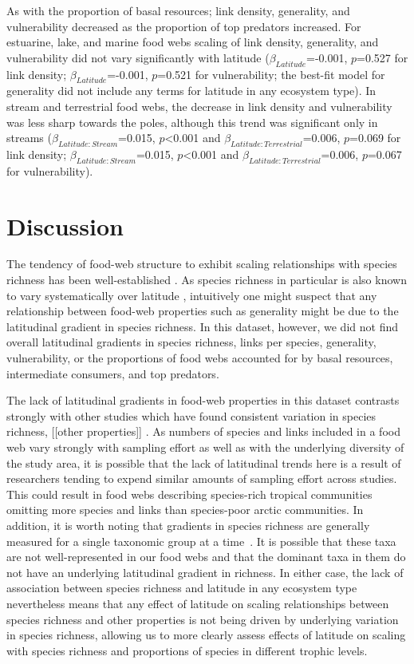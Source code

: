 \documentclass[12pt]{article}
\begin{document}
As with the proportion of basal resources; link density, generality, and
vulnerability decreased as the proportion of top predators increased. For
estuarine, lake, and marine food webs scaling of link density, generality, and
vulnerability did not vary significantly with latitude
($\beta_{Latitude}$=-0.001, $p$=0.527 for link density;
$\beta_{Latitude}$=-0.001, $p$=0.521 for vulnerability; the best-fit model for
generality did not include any terms for latitude in any ecosystem type). In
stream and terrestrial food webs, the decrease in link density and
vulnerability was less sharp towards the poles, although this trend was
significant only in streams ($\beta_{Latitude:Stream}$=0.015,
$p$\textless0.001 and $\beta_{Latitude:Terrestrial}$=0.006, $p$=0.069 for link
density; $\beta_{Latitude:Stream}$=0.015, $p$\textless0.001 and
$\beta_{Latitude:Terrestrial}$=0.006, $p$=0.067 for vulnerability).



\section*{Discussion}

The tendency of food-web structure to exhibit scaling relationships with
species richness has been well-established \citep{Dunne2004,Riede2010}. As
species richness in particular is also known to vary systematically over
latitude \citep{}, intuitively one might suspect that any relationship
between food-web properties such as generality might be due to the latitudinal
gradient in species richness. In this dataset, however, we did not find
overall latitudinal gradients in species richness, links per species, 
generality, vulnerability, or the proportions of food webs accounted for by 
basal resources, intermediate consumers, and top predators. 


The lack of latitudinal gradients in food-web properties in this dataset contrasts
strongly with other studies which have found consistent variation in species richness,
[[other properties]] \citep{}. As numbers of species and links included in a food web
vary strongly with sampling effort as well as with the underlying diversity of the study
area, it is possible that the lack of latitudinal trends here is a result of researchers
tending to expend similar amounts of sampling effort across studies. This could result in
food webs describing species-rich tropical communities omitting more species and links
than species-poor arctic communities. In addition, it is worth noting that gradients in
species richness are generally measured for a single taxonomic group at a time~\citep{}.
It is possible that these taxa are not well-represented in our food webs and that the
dominant taxa in them do not have an underlying latitudinal gradient in richness. In
either case, the lack of association between species richness
and latitude in any ecosystem type nevertheless means that any effect of latitude on scaling relationships
between species richness and other properties is not being driven by underlying variation in
species richness, allowing us to more clearly assess effects of latitude on scaling with 
species richness and proportions of species in different trophic levels.
\end{document}
